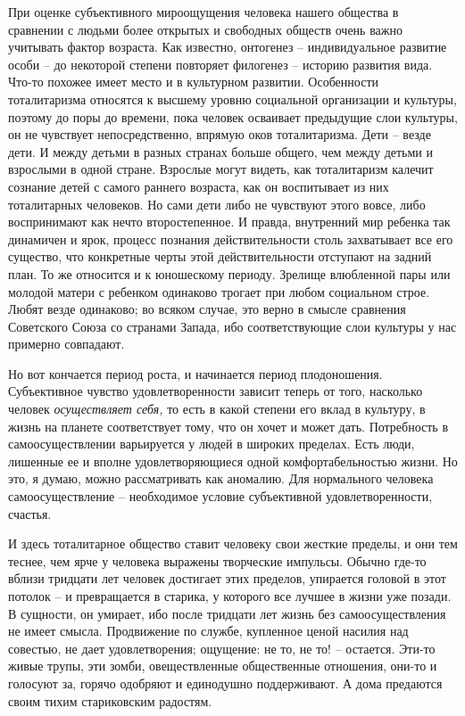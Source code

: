 \documentclass{book}
\begin{document}
При оценке субъективного мироощущения человека нашего общества в сравнении с людьми более открытых и свободных обществ очень 
важно учитывать фактор возраста. Как известно, онтогенез -- индивидуальное развитие особи -- до некоторой степени повторяет 
филогенез -- историю развития вида. Что-то похожее имеет место и в культурном развитии. Особен­ности тоталитаризма относятся к 
высшему уровню социальной организации и культуры, поэтому до поры до времени, пока человек осваивает предыдущие слои культуры, 
он не чувствует непосредственно, впрямую оков тоталитаризма. Дети -- везде дети. И между детьми в разных странах больше общего, 
чем между детьми и взрослыми в одной стране. Взрослые могут видеть, как тоталитаризм калечит сознание детей с самого раннего 
возраста, как он воспитывает из них тоталитарных человеков. Но сами дети либо не чувствуют этого вовсе, либо воспринимают как 
нечто второстепенное. И правда, внутренний мир ребенка так динамичен и ярок, процесс познания действительности столь захватывает 
все его существо, что конкретные черты этой действительности отступают на задний план. То же относится и к юношескому периоду. 
Зрелище влюбленной пары или молодой матери с ребенком одинаково трогает при любом социальном строе. Любят везде одинаково; во 
всяком случае, это верно в смысле сравнения Советского Союза со странами Запада, ибо соответствующие слои культуры у нас 
примерно совпадают.

Но вот кончается период роста, и начинается период плодо­ношения. Субъективное чувство удовлетворенности зависит теперь от того, 
насколько человек \textit{осуществляет себя,}  то есть в какой степени его вклад в культуру, в жизнь на планете соответствует 
тому, что он хочет и может дать. Потребность в самоосуществлении варьируется у людей в широких пределах. Есть люди, лишенные ее 
и вполне удовлетворяющиеся одной комфортабельностью жизни. Но это, я думаю, можно рассматривать как аномалию. Для нормального 
человека самоосуществление -- необходимое условие субъективной удовлетворенности, счастья.

И здесь тоталитарное общество ставит человеку свои жесткие пределы, и они тем теснее, чем ярче у человека выражены творческие 
импульсы. Обычно где-то вблизи тридцати лет человек достигает этих пределов, упирается головой в этот потолок -- и превращается 
в старика, у которого все лучшее в жизни уже позади. В сущности, он умирает, ибо после тридцати лет жизнь без самоосуществления 
не имеет смысла. Продвиже­ние по службе, купленное ценой насилия над совестью, не дает удовлетворения; ощущение: не то, не то! -- 
остается. Эти-то живые трупы, эти зомби, овеществленные общественные отно­шения, они-то и голосуют за, горячо одобряют и 
единодушно поддерживают. А дома предаются своим тихим стариковским радостям.
\end{document}
